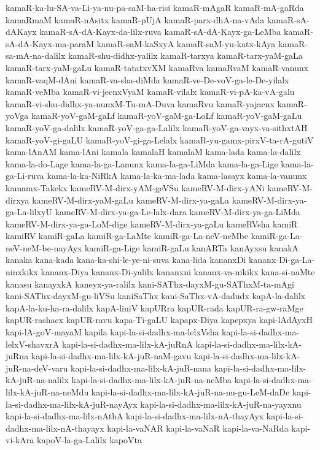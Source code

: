 {kamaR-ka-lu-SA-va-Li-ya-nu-pa-saM-ha-risi
kamaR-mAgaR
kamaR-mA-gaRda
kamaRmaM
kamaR-nAsitx
kamaR-pUjA
kamaR-parx-dhA-na-vAda
kamaR-sA-dAKayx
kamaR-sA-dA-Kayx-da-lilx-ruva
kamaR-sA-dA-Kayx-ga-LeMba
kamaR-sA-dA-Kayx-ma-paraM
kamaR-saM-kaSxyA
kamaR-saM-yu-katx-kAya
kamaR-sa-mA-na-dalilx
kamaR-shu-didhx-yalilx
kamaR-tarxya
kamaR-tarx-yaM-gaLa
kamaR-tarx-yaM-gaLu
kamaR-tatatxvXM
kamaRva
kamaRvaM
kamaR-vanunx
kamaR-vaqM-dAni
kamaR-va-sha-diMda
kamaR-ve-De-voV-ga-le-De-yilalx
kamaR-veMba
kamaR-vi-jecnxVyaM
kamaR-vilalx
kamaR-vi-pA-ka-vA-galu
kamaR-vi-shu-didhx-ya-nunxM-Tu-mA-Duva
kamaRvu
kamaR-yajacnx
kamaR-yoVga
kamaR-yoV-gaM-gaLf
kamaR-yoV-gaM-ga-LoLf
kamaR-yoV-gaM-gaLu
kamaR-yoV-ga-dalilx
kamaR-yoV-ga-ga-Lalilx
kamaR-yoV-ga-vayx-va-sithxtAH
kamaR-yoV-gi-gaLU
kamaR-yoV-gi-ga-Lelalx
kamaR-yu-gamx-pirxV-ta-rA-gutiV
kama-lAnAM
kama-lAni
kamala
kamalaH
kamalaM
kama-lada
kama-la-dalilx
kama-la-do-Lage
kama-la-ga-Lanunx
kama-la-ga-LiMda
kama-la-ga-Lige
kama-la-ga-Li-ruva
kama-la-ka-NiRkA
kama-la-ka-ma-lada
kama-lasayx
kama-la-vanunx
kamamx-Takekx
kameRV-M-dirx-yAM-geVSu
kameRV-M-dirx-yANi
kameRV-M-dirxya
kameRV-M-dirx-yaM-gaLu
kameRV-M-dirx-ya-gaLa
kameRV-M-dirx-ya-ga-La-lilxyU
kameRV-M-dirx-ya-ga-Le-lalx-dara
kameRV-M-dirx-ya-ga-LiMda
kameRV-M-dirx-ya-ga-LoM-dige
kameRV-M-dirx-ya-gaLu
kameRVsha
kamiR
kamiRV
kamiR-gaLa
kamiR-ga-LaMte
kamiR-ga-La-neV-neMbe
kamiR-ga-La-neV-neM-be-nayAyx
kamiR-ga-Lige
kamiR-gaLu
kanARTa
kanAyxsu
kanakA
kanaka
kana-kada
kana-ka-shi-le-ye-ni-suva
kana-lida
kananxDi
kananx-Di-ga-La-ninxkikx
kananx-Diya
kananx-Di-yalilx
kananxni
kananx-va-nikikx
kana-si-naMte
kanasu
kanayxkA
kaneyx-ya-ralilx
kani-SAThx-dayxM-gu-SAThxM-ta-mAgi
kani-SAThx-dayxM-gu-liVSu
kaniSaThx
kani-SaThx-vA-dadudx
kapA-la-dalilx
kapA-la-ku-ha-ra-dalilx
kapA-liniV
kapURra
kapUR-rada
kapUR-ra-gw-raMge
kapUR-rashacx
kapUR-ravu
kapa-Ti-gaLU
kapapx-Diya
kapepxya
kapi-lAdAyxH
kapi-lA-goV-mayaM
kapila
kapi-la-si-dadhx-ma-lelxVsha
kapi-la-si-dadhx-ma-lelxV-shavxrA
kapi-la-si-dadhx-ma-lilx-kA-juRnA
kapi-la-si-dadhx-ma-lilx-kA-juRna
kapi-la-si-dadhx-ma-lilx-kA-juR-naM-gavu
kapi-la-si-dadhx-ma-lilx-kA-juR-na-deV-varu
kapi-la-si-dadhx-ma-lilx-kA-juR-nana
kapi-la-si-dadhx-ma-lilx-kA-juR-na-nalilx
kapi-la-si-dadhx-ma-lilx-kA-juR-na-neMba
kapi-la-si-dadhx-ma-lilx-kA-juR-na-neMdu
kapi-la-si-dadhx-ma-lilx-kA-juR-na-nu-gu-LeM-daDe
kapi-la-si-dadhx-ma-lilx-kA-juR-nayAyx
kapi-la-si-dadhx-ma-lilx-kA-juR-na-yayxnu
kapi-la-si-dadhx-ma-lilx-nAthA
kapi-la-si-dadhx-ma-lilx-nA-thayAyx
kapi-la-si-dadhx-ma-lilx-nA-thayayx
kapi-la-vaNAR
kapi-la-vaNaR
kapi-la-va-NaRda
kapi-vi-kAra
kapoV-la-ga-Lalilx
kapoVta
}
